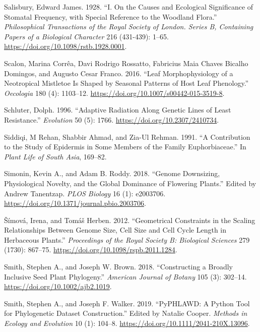 \documentclass[
  12pt,
]{article}
\newlength{\cslhangindent}
\newlength{\cslentryspacingunit} %
\newenvironment{CSLReferences}[2] %
 {%
  \setlength{\parindent}{0pt}
  \ifodd #1
  \let\oldpar\par
  \def\par{\hangindent=\cslhangindent\oldpar}
  \fi
  \setlength{\parskip}{#2\cslentryspacingunit}
 }%
 {}
\begin{document}
\begin{CSLReferences}{1}{0}
\leavevmode{}%
Salisbury, Edward James. 1928. {``I. {On} the Causes and Ecological Significance of Stomatal Frequency, with Special Reference to the Woodland Flora.''} \emph{Philosophical Transactions of the Royal Society of London. Series B, Containing Papers of a Biological Character} 216 (431-439): 1--65. \url{https://doi.org/10.1098/rstb.1928.0001}.

\leavevmode{}%
Scalon, Marina Corrêa, Davi Rodrigo Rossatto, Fabricius Maia Chaves Bicalho Domingos, and Augusto Cesar Franco. 2016. {``Leaf Morphophysiology of a {Neotropical} Mistletoe Is Shaped by Seasonal Patterns of Host Leaf Phenology.''} \emph{Oecologia} 180 (4): 1103--12. \url{https://doi.org/10.1007/s00442-015-3519-8}.

\leavevmode{}%
Schluter, Dolph. 1996. {``Adaptive {Radiation} {Along} {Genetic} {Lines} of {Least} {Resistance}.''} \emph{Evolution} 50 (5): 1766. \url{https://doi.org/10.2307/2410734}.

\leavevmode{}%
Siddiqi, M Rehan, Shabbir Ahmad, and Zia-Ul Rehman. 1991. {``A Contribution to the Study of Epidermis in Some Members of the Family {Euphorbiaceae}.''} In \emph{Plant {Life} of {South} {Asia}}, 169--82.

\leavevmode{}%
Simonin, Kevin A., and Adam B. Roddy. 2018. {``Genome Downsizing, Physiological Novelty, and the Global Dominance of Flowering Plants.''} Edited by Andrew Tanentzap. \emph{PLOS Biology} 16 (1): e2003706. \url{https://doi.org/10.1371/journal.pbio.2003706}.

\leavevmode{}%
Šímová, Irena, and Tomáš Herben. 2012. {``Geometrical Constraints in the Scaling Relationships Between Genome Size, Cell Size and Cell Cycle Length in Herbaceous Plants.''} \emph{Proceedings of the Royal Society B: Biological Sciences} 279 (1730): 867--75. \url{https://doi.org/10.1098/rspb.2011.1284}.

\leavevmode{}%
Smith, Stephen A., and Joseph W. Brown. 2018. {``Constructing a Broadly Inclusive Seed Plant Phylogeny.''} \emph{American Journal of Botany} 105 (3): 302--14. \url{https://doi.org/10.1002/ajb2.1019}.

\leavevmode{}%
Smith, Stephen A., and Joseph F. Walker. 2019. {``{PyPHLAWD}: {A} Python Tool for Phylogenetic Dataset Construction.''} Edited by Natalie Cooper. \emph{Methods in Ecology and Evolution} 10 (1): 104--8. \url{https://doi.org/10.1111/2041-210X.13096}.


\end{CSLReferences}
\end{document}
